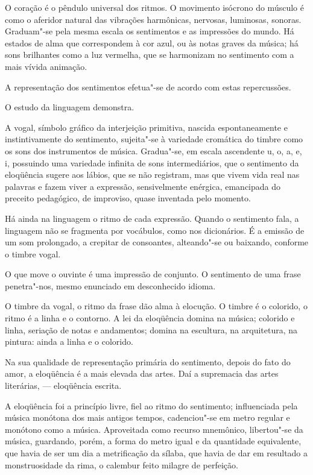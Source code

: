 O coração é o pêndulo universal dos ritmos. O
movimento isócrono do músculo é como o aferidor natural das vibrações
harmônicas, nervosas, luminosas, sonoras. Graduam"-se pela mesma
escala os sentimentos e as impressões do mundo. Há estados de alma que
correspondem à cor azul, ou às notas graves da música; há sons
brilhantes como a luz vermelha, que se harmonizam no sentimento com a
mais vívida animação. 

A representação dos sentimentos efetua"-se de
acordo com estas repercussões. 

O estudo da linguagem demonstra. 

A vogal, símbolo gráfico da interjeição primitiva, nascida
espontaneamente e instintivamente do sentimento, sujeita"-se à
variedade cromática do timbre como os sons dos instrumentos de música.
Gradua"-se, em escala ascendente u, o, a, e, i, possuindo uma
variedade infinita de sons intermediários, que o sentimento da
eloqüência sugere aos lábios, que se não registram, mas que vivem vida
real nas palavras e fazem viver a expressão, sensivelmente enérgica,
emancipada do preceito pedagógico, de improviso, quase inventada pelo
momento. 

Há ainda na linguagem o ritmo de cada expressão. Quando o
sentimento fala, a linguagem não se fragmenta por vocábulos, como nos
dicionários. É a emissão de um som prolongado, a crepitar de
consoantes, alteando"-se ou baixando, conforme o timbre vogal. 

O que move o ouvinte é uma impressão de conjunto. O sentimento de uma frase
penetra"-nos, mesmo enunciado em desconhecido idioma. 

O timbre da vogal, o ritmo da frase dão alma à elocução. O timbre é o colorido, o
ritmo é a linha e o contorno. A lei da eloqüência domina na música;
colorido e linha, seriação de notas e andamentos; domina na escultura,
na arquitetura, na pintura: ainda a linha e o colorido. 

Na sua qualidade de representação primária do sentimento, depois do fato do
amor, a eloqüência é a mais elevada das artes. Daí a supremacia das
artes literárias, --- eloqüência escrita. 

A eloqüência foi a princípio
livre, fiel ao ritmo do sentimento; influenciada pela música monótona
dos mais antigos tempos, cadenciou"-se em metro regular e monótono
como a música. Aproveitada como recurso mnemônico, libertou"-se da
música, guardando, porém, a forma do metro igual e da quantidade
equivalente, que havia de ser um dia a metrificação da sílaba, que
havia de dar em resultado a monstruosidade da rima, o calembur feito
milagre de perfeição. 

